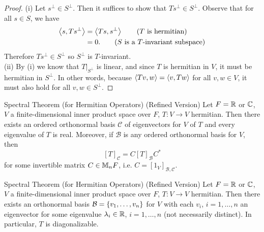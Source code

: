 \documentclass[class=article, crop=false]{standalone}
\begin{document}
  \begin{proof}
    (i) Let $s^\perp\in S^\perp$. Then it suffices to show that $Ts^\perp\in S^\perp$. Observe that for all $s\in S$, we have
    \begin{align*}
      \left\langle s, Ts^\perp \right\rangle &= \left\langle Ts, s^\perp \right\rangle \tag{$T$ is hermitian} \\
                        &= 0. \tag{$S$ is a $T$-invariant subspace}
    \end{align*}
    Therefore $Ts^\perp\in S^\perp$ so $S^\perp$ is $T$-invariant. \\[10pt]
    (ii) By (i) we know that $T|_{S^\perp}$ is linear, and since $T$ is hermitian in $V$, it must be hermitian in $S^\perp$. In other words, because $\left\langle Tv, w \right\rangle = \left\langle v, Tw \right\rangle$ for all $v, w\in V$, it must also hold for all $v, w\in S^\perp$.
  \end{proof}
  \newpage
  \begin{theorem}{Spectral Theorem (for Hermitian Operators) (Refined Version)}
    Let $F = \mathbb{R}$ or $\mathbb{C}$, $V$ a finite-dimensional inner product space over $F$, $T\colon V\to V$ hermitian. Then there exists an ordered orthonormal basis $\mathcal{C}$ of eigenvectors for $V$ of $T$ and every eigenvalue of $T$ is real. Moreover, if $\mathcal{B}$ is any ordered orthonormal basis for $V$, then
    \[
      [T]_{\mathcal{C}} = C[T]_{\mathcal{B}}C^*
    \]
    for some invertible matrix $C\in \mathbb{M}_nF$, i.e. $C = [1_V]_{\mathcal{B},\mathcal{C}}$.
  \end{theorem}
  \begin{theorem}{Spectral Theorem (for Hermitian Operators) (Refined Version)}
    Let $F = \mathbb{R}$ or $\mathbb{C}$, $V$ a finite-dimensional inner product space over $F$, $T\colon V\to V$ hermitian. Then there exists an orthonormal basis $\mathcal{B} = \left\{v_1,\dotsc,v_n\right\}$ for $V$ with each $v_i$, $i=1,\dotsc,n$ an eigenvector for some eigenvalue $\lambda_i\in \mathbb{R}$, $i=1,\dotsc,n$ (not necessarily distinct). In particular, $T$ is diagonalizable.
  \end{theorem}
\end{document}

